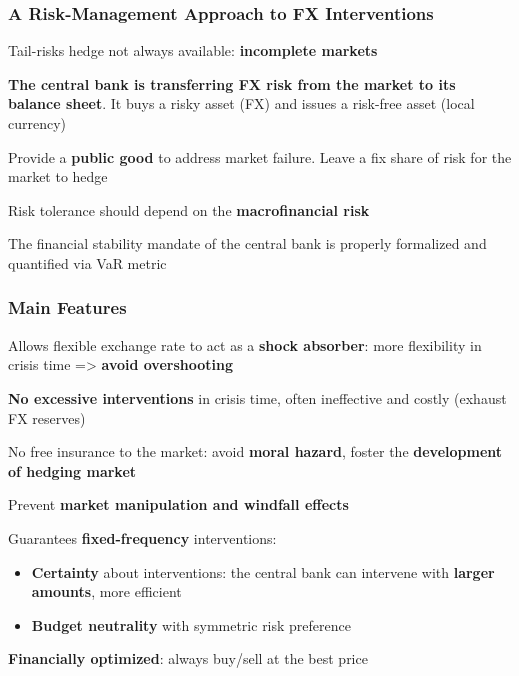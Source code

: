 \documentclass{beamer}
\newenvironment{largeitemize}{\itemize\addtolength{\itemsep}{10pt}}{\enditemize}
\newenvironment{largeenumerate}{\enumerate\addtolength{\itemsep}{10pt}}{\endenumerate}
\begin{document}
\begin{frame}
  \frametitle{A Risk-Management Approach to FX Interventions}
  \begin{largeitemize}    
  \item Tail-risks hedge not always available: \textbf{incomplete markets}
    \item \textbf{The central bank is transferring FX risk from the market to
      its balance sheet}. It buys a risky asset (FX) and issues a risk-free asset
      (local currency)    
    \item Provide a \textbf{public good} to address market failure. Leave a
      fix share of risk for the market to hedge 
    \item Risk tolerance should depend on the \textbf{macrofinancial risk} 
    \item The financial stability mandate of the central bank is properly
      formalized and quantified via VaR metric
  \end{largeitemize}  
\end{frame}

\begin{frame}
    \frametitle{Main Features}
  \begin{largeenumerate}
  \item Allows flexible exchange rate to act as a \textbf{shock absorber}:
    more flexibility in crisis time => \textbf{avoid overshooting}
  \item \textbf{No excessive interventions} in crisis time, often ineffective
    and costly (exhaust FX reserves)
  \item No free insurance to the market: avoid \textbf{moral
      hazard}, foster the \textbf{development of hedging market}
  \item Prevent \textbf{market manipulation and windfall effects}
  \item Guarantees \textbf{fixed-frequency} interventions: 
    \begin{itemize}
    \item \textbf{Certainty} about interventions: the central bank can intervene with
      \textbf{larger amounts}, more efficient
    \item \textbf{Budget neutrality} with symmetric risk preference
    \end{itemize}

  \item \textbf{Financially optimized}: always buy/sell at the best price
  \end{largeenumerate}  
\end{frame}
\end{document}
